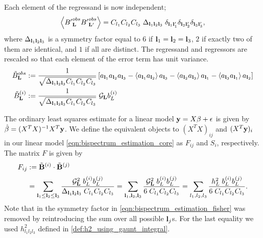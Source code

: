 Each element of the regressand is now independent;
\begin{align}
	\left< {B'}^{obs}_\mathbf{L} {B'}^{obs}_{\mathbf{L}'} \right> = C_{l_1} C_{l_2} C_{l_3} \; \Delta_{\mathbf{l}_1 \mathbf{l}_2 \mathbf{l}_3} \; \delta_{\mathbf{l}_1 \mathbf{l}'_1} \delta_{\mathbf{l}_2 \mathbf{l}'_2} \delta_{\mathbf{l}_3 \mathbf{l}'_3},
\end{align}
where $\Delta_{\mathbf{l}_1 \mathbf{l}_2 \mathbf{l}_3}$ is a symmetry factor equal to $6$ if $\mathbf{l}_1 = \mathbf{l}_2 = \mathbf{l}_3$, $2$ if exactly two of them are identical, and $1$ if all are distinct. The regressand and regressors are rescaled so that each element of the error term has unit variance.
\begin{align}
	\tilde{B}^{obs}_\mathbf{L} &:= \frac{1}{\sqrt{\Delta_{\mathbf{l}_1 \mathbf{l}_2 \mathbf{l}_3} C_{l_1} C_{l_2} C_{l_3}}} \left[ a_{\mathbf{l}_1} a_{\mathbf{l}_2} a_{\mathbf{l}_3} - \left< a_{\mathbf{l}_1} a_{\mathbf{l}_2} \right> a_{\mathbf{l}_3} - \left< a_{\mathbf{l}_2} a_{\mathbf{l}_3} \right> a_{\mathbf{l}_1} - \left< a_{\mathbf{l}_3} a_{\mathbf{l}_1} \right> a_{\mathbf{l}_2} \right] \\
	\tilde{B}^{(i)}_\mathbf{L} &:= \frac{1}{\sqrt{\Delta_{\mathbf{l}_1 \mathbf{l}_2 \mathbf{l}_3} C_{l_1} C_{l_2} C_{l_3}}} \; \mathcal{G}_{\mathbf{L}} b^{(i)}_{L}
\end{align}

The ordinary least squares estimate for a linear model $\mathbf{y} = X\mathbf{\beta} + \mathbf{\epsilon}$ is given by $\hat{\beta} = (X^T X)^{-1} X^T \mathbf{y}$. We define the equivalent objects to $(X^T X)_{ij}$ and $(X^T \mathbf{y})_i$ in our linear model \eqref{eqn:bispectrum_estimation_core} as $F_{ij}$ and $S_i$, respectively. The matrix $F$ is given by
\begin{align}
	F_{ij} &:= \tilde{\mathbf{B}}^{(i)} \cdot \tilde{\mathbf{B}}^{(j)} \\[0.5ex]
	&= \sum_{\mathbf{l}_1 \le \mathbf{l}_2 \le \mathbf{l}_3}  \frac{\mathcal{G}_{\mathbf{L}}^2 \; b^{(i)}_{L} b^{(j)}_{L}}{\Delta_{\mathbf{l}_1 \mathbf{l}_2 \mathbf{l}_3} \; C_{l_1} C_{l_2} C_{l_3}}   
	= \sum_{\mathbf{l}_1 , \mathbf{l}_2 , \mathbf{l}_3}  \frac{\mathcal{G}_{\mathbf{L}}^2 \; b^{(i)}_{L} b^{(j)}_{L}}{6 \; C_{l_1} C_{l_2} C_{l_3}}
	= \sum_{l_1,l_2,l_3}  \frac{h^2_L \; b^{(i)}_{L} b^{(j)}_{L}}{6 \; C_{l_1} C_{l_2} C_{l_3}}. \label{eqn:bispectrum_estimation_fisher}
\end{align}
Note that in the symmetry factor in \eqref{eqn:bispectrum_estimation_fisher} was removed by reintroducing the sum over all possible $\mathbf{l}_j$s. For the last equality we used $h^2_{l_1 l_2 l_3}$ defined in \eqref{def:h2_using_gaunt_integral}.

